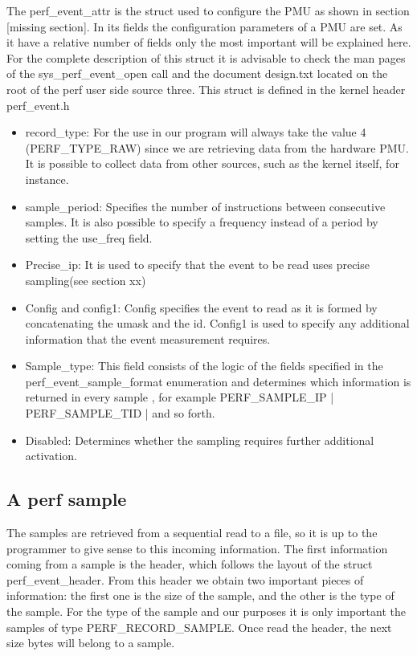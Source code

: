 The perf\_event\_attr is the struct used to configure the PMU as shown in section [missing section]. In its fields the configuration parameters of a PMU are set. As it have a relative number of fields only the most important will be explained here. For the complete description of this struct it is advisable to check the man pages of the sys\_perf\_event\_open call and the document design.txt located on the root of the perf user side source three. This struct is defined in the kernel header perf\_event.h 
\begin{itemize}
	\item record\_type: For the use in our program will always take the value 4 (PERF\_TYPE\_RAW) since we are retrieving data from the hardware PMU. It is possible to collect data from other sources, such as the kernel itself, for instance.
	\item sample\_period: Specifies the number of instructions between consecutive samples. It is also possible to specify a frequency instead of a period by setting the use\_freq field.
	\item Precise\_ip: It is used to specify that the event to be read uses precise sampling(see section xx) 
	\item Config and config1: Config specifies the event to read as it is formed by concatenating the umask and the id. Config1 is used to specify any
 additional information that the event measurement requires. 
	\item Sample\_type: This field consists of the logic of the fields specified in the perf\_event\_sample\_format enumeration and determines which information is returned in every sample , for example PERF\_SAMPLE\_IP | PERF\_SAMPLE\_TID | and so forth.
	\item Disabled: Determines whether the sampling requires further additional activation.
\end{itemize}
     
\subsection{A perf sample}\label{section:pf-samplu}
     
The samples are retrieved from a sequential read to a file, so it is up to the programmer to give sense to this incoming information. The first information coming from a sample is the header, which follows the layout of the struct   perf\_event\_header. From this header we obtain two important pieces of information: the first one is the size of the sample, and the other is the type of the sample. For the type of the sample and our purposes it is only important the samples of type PERF\_RECORD\_SAMPLE. Once read the header, the next size bytes will belong to a sample. 


